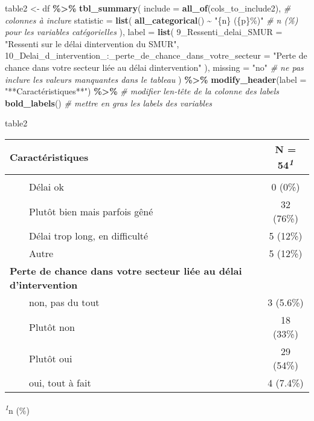 \documentclass[
]{article}
\newenvironment{Shaded}{\begin{snugshade}}{\end{snugshade}}
\newcommand{\AttributeTok}[1]{\textcolor[rgb]{0.13,0.29,0.53}{#1}}
\newcommand{\CommentTok}[1]{\textcolor[rgb]{0.56,0.35,0.01}{\textit{#1}}}
\newcommand{\FunctionTok}[1]{\textcolor[rgb]{0.13,0.29,0.53}{\textbf{#1}}}
\newcommand{\NormalTok}[1]{#1}
\newcommand{\OtherTok}[1]{\textcolor[rgb]{0.56,0.35,0.01}{#1}}
\newcommand{\SpecialCharTok}[1]{\textcolor[rgb]{0.81,0.36,0.00}{\textbf{#1}}}
\newcommand{\StringTok}[1]{\textcolor[rgb]{0.31,0.60,0.02}{#1}}
\begin{document}
\begin{Shaded}
\begin{Highlighting}[]
\NormalTok{table2 }\OtherTok{\textless{}{-}}\NormalTok{ df }\SpecialCharTok{\%\textgreater{}\%} 
  \FunctionTok{tbl\_summary}\NormalTok{(}
    \AttributeTok{include =} \FunctionTok{all\_of}\NormalTok{(cols\_to\_include2), }\CommentTok{\# colonnes à inclure}
    \AttributeTok{statistic =} \FunctionTok{list}\NormalTok{(}
      \FunctionTok{all\_categorical}\NormalTok{() }\SpecialCharTok{\textasciitilde{}} \StringTok{"\{n\} (\{p\}\%)"} \CommentTok{\# n (\%) pour les variables catégorielles}
\NormalTok{    ),}
    \AttributeTok{label =} \FunctionTok{list}\NormalTok{(}
      \StringTok{\textasciigrave{}}\AttributeTok{9\_Ressenti\_delai\_SMUR}\StringTok{\textasciigrave{}} \OtherTok{=} \StringTok{"Ressenti sur le délai d\textquotesingle{}intervention du SMUR"}\NormalTok{,}
      \StringTok{\textasciigrave{}}\AttributeTok{10\_Delai\_d\_intervention\_:\_perte\_de\_chance\_dans\_votre\_secteur}\StringTok{\textasciigrave{}} \OtherTok{=} \StringTok{"Perte de chance dans votre secteur liée au délai d\textquotesingle{}intervention"}
\NormalTok{    ),}
    \AttributeTok{missing =} \StringTok{"no"} \CommentTok{\# ne pas inclure les valeurs manquantes dans le tableau}
\NormalTok{  ) }\SpecialCharTok{\%\textgreater{}\%}
  \FunctionTok{modify\_header}\NormalTok{(}\AttributeTok{label =} \StringTok{"**Caractéristiques**"}\NormalTok{) }\SpecialCharTok{\%\textgreater{}\%} \CommentTok{\# modifier l\textquotesingle{}en{-}tête de la colonne des labels}
  \FunctionTok{bold\_labels}\NormalTok{() }\CommentTok{\# mettre en gras les labels des variables}

\NormalTok{table2}
\end{Highlighting}
\end{Shaded}

\begin{table}[t]
\fontsize{12.0pt}{14.4pt}\selectfont
\begin{tabular*}{\linewidth}{@{\extracolsep{\fill}}lc}
\toprule
\textbf{Caractéristiques} & \textbf{N = 54}\textsuperscript{\textit{1}} \\ 
\midrule\addlinespace[2.5pt]
{\bfseries Ressenti sur le délai d'intervention du SMUR} &  \\ 
    Délai ok & 0 (0\%) \\ 
    Plutôt bien mais parfois gêné & 32 (76\%) \\ 
    Délai trop long, en difficulté & 5 (12\%) \\ 
    Autre & 5 (12\%) \\ 
{\bfseries Perte de chance dans votre secteur liée au délai d'intervention} &  \\ 
    non, pas du tout & 3 (5.6\%) \\ 
    Plutôt non & 18 (33\%) \\ 
    Plutôt oui & 29 (54\%) \\ 
    oui, tout à fait & 4 (7.4\%) \\ 
\bottomrule
\end{tabular*}
\begin{minipage}{\linewidth}
\textsuperscript{\textit{1}}n (\%)\\
\end{minipage}
\end{table}
\end{document}
